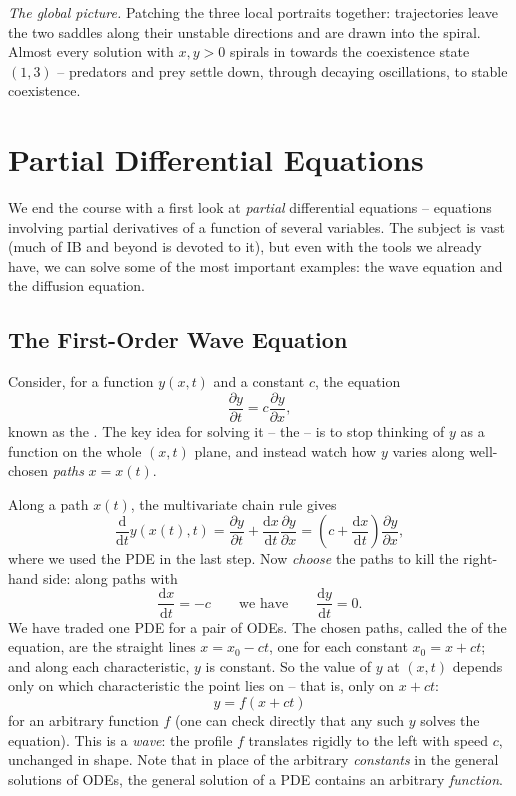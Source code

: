 \documentclass[a4paper]{scrartcl}
\begin{document}
\begin{example}
	\emph{The global picture.} Patching the three local portraits together: trajectories leave the two saddles along their unstable directions and are drawn into the spiral. Almost every solution with $x, y > 0$ spirals in towards the coexistence state $(1, 3)$ -- predators and prey settle down, through decaying oscillations, to stable coexistence.
\end{example}

\section{Partial Differential Equations}

We end the course with a first look at \emph{partial} differential equations -- equations involving partial derivatives of a function of several variables. The subject is vast (much of IB and beyond is devoted to it), but even with the tools we already have, we can solve some of the most important examples: the wave equation and the diffusion equation.

\subsection{The First-Order Wave Equation}

Consider, for a function $y(x, t)$ and a constant $c$, the equation
$$
\frac{\partial y}{\partial t} = c \frac{\partial y}{\partial x},
$$
known as the . The key idea for solving it -- the  -- is to stop thinking of $y$ as a function on the whole $(x, t)$ plane, and instead watch how $y$ varies along well-chosen \emph{paths} $x = x(t)$.

Along a path $x(t)$, the multivariate chain rule gives
$$
\frac{\mathrm{d}}{\mathrm{d}t} y(x(t), t) = \frac{\partial y}{\partial t} + \frac{\mathrm{d}x}{\mathrm{d}t}\frac{\partial y}{\partial x} = \left(c + \frac{\mathrm{d}x}{\mathrm{d}t}\right)\frac{\partial y}{\partial x},
$$
where we used the PDE in the last step. Now \emph{choose} the paths to kill the right-hand side: along paths with
$$
\frac{\mathrm{d}x}{\mathrm{d}t} = -c \qquad \text{we have} \qquad \frac{\mathrm{d}y}{\mathrm{d}t} = 0.
$$
We have traded one PDE for a pair of ODEs. The chosen paths, called the  of the equation, are the straight lines $x = x_0 - ct$, one for each constant $x_0 = x + ct$; and along each characteristic, $y$ is constant. So the value of $y$ at $(x,t)$ depends only on which characteristic the point lies on -- that is, only on $x + ct$:
$$
y = f(x + ct)
$$
for an arbitrary function $f$ (one can check directly that any such $y$ solves the equation). This is a \emph{wave}: the profile $f$ translates rigidly to the left with speed $c$, unchanged in shape. Note that in place of the arbitrary \emph{constants} in the general solutions of ODEs, the general solution of a PDE contains an arbitrary \emph{function}.
\end{document}

